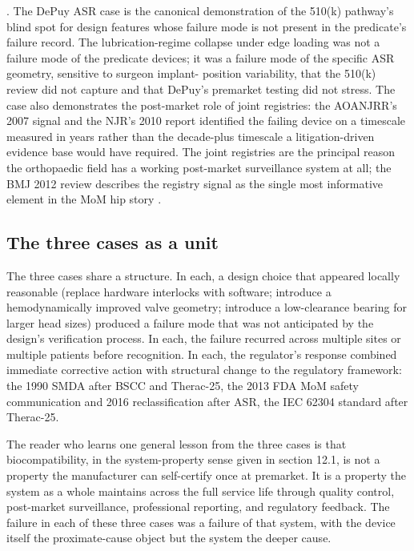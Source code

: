 . The DePuy ASR case is the
canonical demonstration of the 510(k) pathway's blind spot for
design features whose failure mode is not present in the predicate's
failure record. The lubrication-regime collapse under edge loading
was not a failure mode of the predicate devices; it was a failure
mode of the specific ASR geometry, sensitive to surgeon implant-
position variability, that the 510(k) review did not capture and
that DePuy's premarket testing did not stress. The case also
demonstrates the post-market role of joint registries: the
AOANJRR's 2007 signal and the NJR's 2010 report identified the
failing device on a timescale measured in years rather than the
decade-plus timescale a litigation-driven evidence base would have
required. The joint registries are the principal reason the
orthopaedic field has a working post-market surveillance system
at all; the BMJ 2012 review describes the registry signal as the
single most informative element in the MoM hip story
\cite{paper:v6c12-cohen-mom-bmj-2012,
paper:v6c12-smith-asr-revision-2012}.

\subsection{The three cases as a unit}

The three cases share a structure. In each, a design choice that
appeared locally reasonable (replace hardware interlocks with
software; introduce a hemodynamically improved valve geometry;
introduce a low-clearance bearing for larger head sizes) produced
a failure mode that was not anticipated by the design's verification
process. In each, the failure recurred across multiple sites or
multiple patients before recognition. In each, the regulator's
response combined immediate corrective action with structural
change to the regulatory framework: the 1990 SMDA after BSCC
and Therac-25, the 2013 FDA MoM safety communication and 2016
reclassification after ASR, the IEC 62304 standard after Therac-25.

The reader who learns one general lesson from the three cases is
that biocompatibility, in the system-property sense given in
section 12.1, is not a property the manufacturer can self-certify
once at premarket. It is a property the system as a whole maintains
across the full service life through quality control, post-market
surveillance, professional reporting, and regulatory feedback.
The failure in each of these three cases was a failure of that
system, with the device itself the proximate-cause object but the
system the deeper cause.

